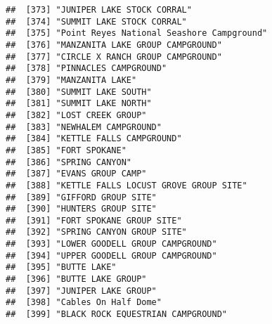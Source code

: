 \documentclass[
]{article}
\begin{document}
\begin{verbatim}
##  [373] "JUNIPER LAKE STOCK CORRAL"                                                           
##  [374] "SUMMIT LAKE STOCK CORRAL"                                                            
##  [375] "Point Reyes National Seashore Campground"                                            
##  [376] "MANZANITA LAKE GROUP CAMPGROUND"                                                     
##  [377] "CIRCLE X RANCH GROUP CAMPGROUND"                                                     
##  [378] "PINNACLES CAMPGROUND"                                                                
##  [379] "MANZANITA LAKE"                                                                      
##  [380] "SUMMIT LAKE SOUTH"                                                                   
##  [381] "SUMMIT LAKE NORTH"                                                                   
##  [382] "LOST CREEK GROUP"                                                                    
##  [383] "NEWHALEM CAMPGROUND"                                                                 
##  [384] "KETTLE FALLS CAMPGROUND"                                                             
##  [385] "FORT SPOKANE"                                                                        
##  [386] "SPRING CANYON"                                                                       
##  [387] "EVANS GROUP CAMP"                                                                    
##  [388] "KETTLE FALLS LOCUST GROVE GROUP SITE"                                                
##  [389] "GIFFORD GROUP SITE"                                                                  
##  [390] "HUNTERS GROUP SITE"                                                                  
##  [391] "FORT SPOKANE GROUP SITE"                                                             
##  [392] "SPRING CANYON GROUP SITE"                                                            
##  [393] "LOWER GOODELL GROUP CAMPGROUND"                                                      
##  [394] "UPPER GOODELL GROUP CAMPGROUND"                                                      
##  [395] "BUTTE LAKE"                                                                          
##  [396] "BUTTE LAKE GROUP"                                                                    
##  [397] "JUNIPER LAKE GROUP"                                                                  
##  [398] "Cables On Half Dome"                                                                 
##  [399] "BLACK ROCK EQUESTRIAN CAMPGROUND"                                                    

\end{verbatim}
\end{document}
